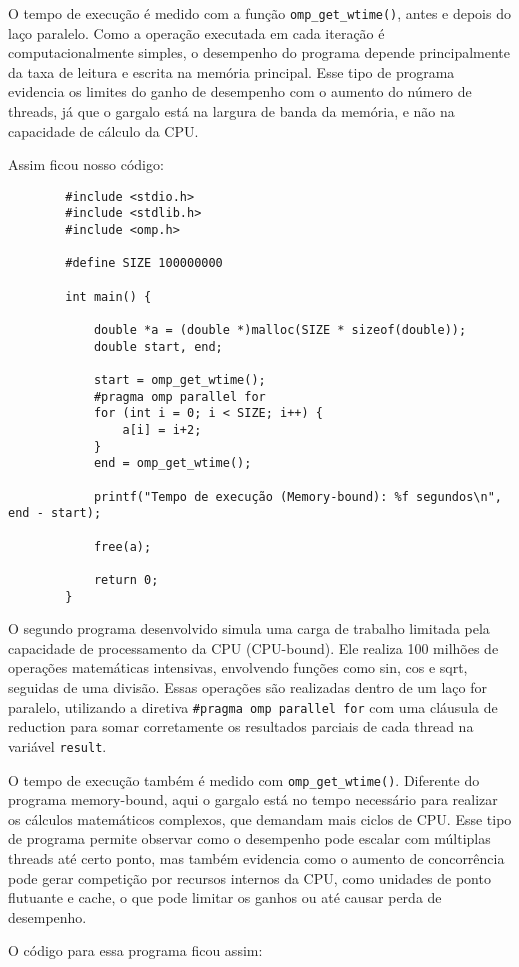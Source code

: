 \documentclass[a4paper, 12pt]{article}
\begin{document}
	O tempo de execução é medido com a função \texttt{omp\_get\_wtime()}, antes e depois do laço paralelo. Como a operação executada em cada iteração é computacionalmente simples, o desempenho do programa depende principalmente da taxa de leitura e escrita na memória principal. Esse tipo de programa evidencia os limites do ganho de desempenho com o aumento do número de threads, já que o gargalo está na largura de banda da memória, e não na capacidade de cálculo da CPU.
	
	Assim ficou nosso código:
	
	\begin{verbatim}
		#include <stdio.h>
		#include <stdlib.h>
		#include <omp.h>
		
		#define SIZE 100000000
		
		int main() {
			
			double *a = (double *)malloc(SIZE * sizeof(double));
			double start, end;
			
			start = omp_get_wtime();
			#pragma omp parallel for
			for (int i = 0; i < SIZE; i++) {
				a[i] = i+2;
			}
			end = omp_get_wtime();
			
			printf("Tempo de execução (Memory-bound): %f segundos\n", end - start);
			
			free(a);
			
			return 0;
		}
	\end{verbatim}
	
	O segundo programa desenvolvido simula uma carga de trabalho limitada pela capacidade de processamento da CPU (CPU-bound). Ele realiza 100 milhões de operações matemáticas intensivas, envolvendo funções como sin, cos e sqrt, seguidas de uma divisão. Essas operações são realizadas dentro de um laço for paralelo, utilizando a diretiva \texttt{\#pragma omp parallel for} com uma cláusula de reduction para somar corretamente os resultados parciais de cada thread na variável \texttt{result}.
	
	O tempo de execução também é medido com \texttt{omp\_get\_wtime()}. Diferente do programa memory-bound, aqui o gargalo está no tempo necessário para realizar os cálculos matemáticos complexos, que demandam mais ciclos de CPU. Esse tipo de programa permite observar como o desempenho pode escalar com múltiplas threads até certo ponto, mas também evidencia como o aumento de concorrência pode gerar competição por recursos internos da CPU, como unidades de ponto flutuante e cache, o que pode limitar os ganhos ou até causar perda de desempenho.
	
	O código para essa programa ficou assim:
	
\end{document}
